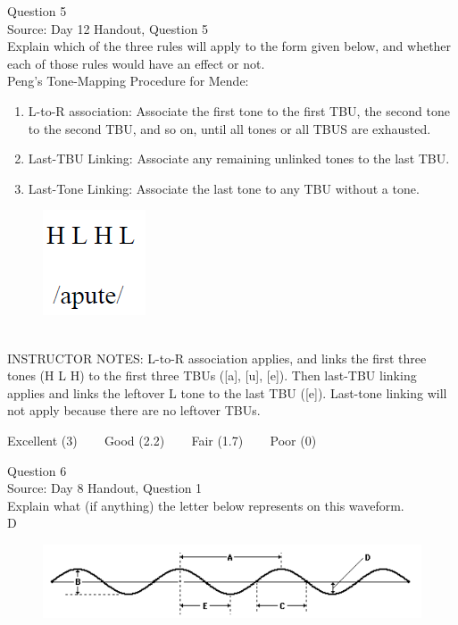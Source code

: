 \documentclass[12pt]{article}
\begin{document}
{\large Question 5}\\

Source: Day 12 Handout, Question 5\\

Explain which of the three rules will apply to the form given below, and whether each of those rules would have an effect or not.\\

Peng’s Tone-Mapping Procedure for Mende: \begin{enumerate} \item L-to-R association: Associate the first tone to the first TBU, the second tone to the second TBU, and so on, until all tones or all TBUS are exhausted. \item Last-TBU Linking: Associate any remaining unlinked tones to the last TBU. \item Last-Tone Linking: Associate the last tone to any TBU without a tone. \end{enumerate}

\begin{figure}[H]
\includegraphics{../images/mendetone_d.png}
\end{figure}

~\\
INSTRUCTOR NOTES: L-to-R association applies, and links the first three tones (H L H) to the first three TBUs ([a], [u], [e]). Then last-TBU linking applies and links the leftover L tone to the last TBU ([e]). Last-tone linking will not apply because there are no leftover TBUs.


\vfill
Excellent (3) ~~~ Good (2.2) ~~~ Fair (1.7) ~~~ Poor (0)
\newpage

{\large Question 6}\\

Source: Day 8 Handout, Question 1\\

Explain what (if anything) the letter below represents on this waveform.\\

D

\begin{figure}[H]
\includegraphics{../images/sinusoid.png}
\end{figure}
\end{document}
